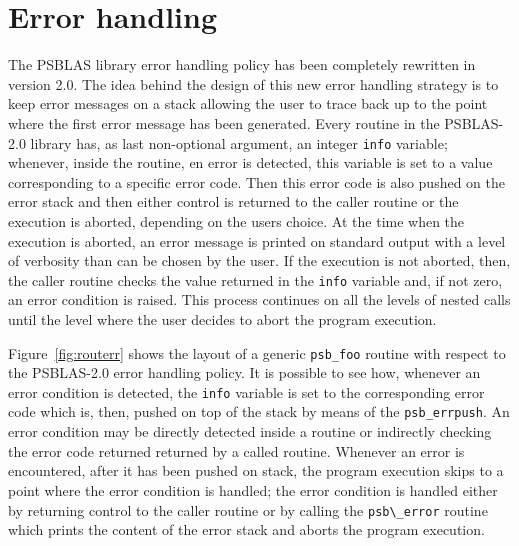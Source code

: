 

\section{Error handling}

The PSBLAS library error handling policy has been completely rewritten
in version 2.0. The idea behind the design of this new error handling
strategy is to keep error messages on a stack allowing the user to
trace back up to the point where the first error message has been
generated. Every routine in the PSBLAS-2.0 library has, as last
non-optional argument, an integer \verb|info| variable; whenever,
inside the routine, en error is detected, this variable is set to a
value corresponding to a specific error code. Then this error code is
also pushed on the error stack and then either control is returned to
the caller routine or the execution is aborted, depending on the users
choice. At the time when the execution is aborted, an error message is
printed on standard output with a level of verbosity than can be
chosen by the user. If the execution is not aborted, then, the caller
routine checks the value returned in the \verb|info| variable and, if
not zero, an error condition is raised. This process continues on all the
levels of nested calls until the level where the user decides to abort
the program execution.

Figure~\ref{fig:routerr} shows the layout of a generic \verb|psb_foo|
routine with respect to the PSBLAS-2.0 error handling policy. It is
possible to see how, whenever an error condition is detected, the
\verb|info| variable is set to the corresponding error code which is,
then, pushed on top of the stack by means of the
\verb|psb_errpush|. An error condition may be directly detected inside
a routine or indirectly checking the error code returned returned by a
called routine. Whenever an error is encountered, after it has been
pushed on stack, the program execution skips to a point where the
error condition is handled; the error condition is handled either by
returning control to the caller routine or by calling the
\verb|psb\_error| routine which prints the content of the error stack
and aborts the program execution.

